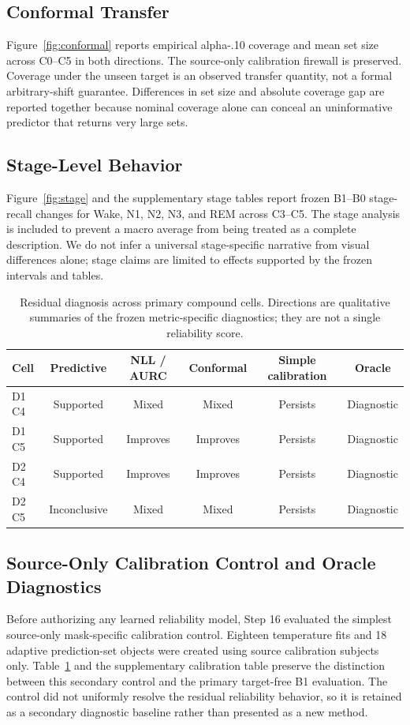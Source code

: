 \documentclass[11pt]{article}
\begin{document}
\subsection{Conformal Transfer}
Figure~\ref{fig:conformal} reports empirical alpha-.10 coverage and mean set size across C0--C5 in both directions. The source-only calibration firewall is preserved. Coverage under the unseen target is an observed transfer quantity, not a formal arbitrary-shift guarantee. Differences in set size and absolute coverage gap are reported together because nominal coverage alone can conceal an uninformative predictor that returns very large sets.

\subsection{Stage-Level Behavior}
Figure~\ref{fig:stage} and the supplementary stage tables report frozen B1--B0 stage-recall changes for Wake, N1, N2, N3, and REM across C3--C5. The stage analysis is included to prevent a macro average from being treated as a complete description. We do not infer a universal stage-specific narrative from visual differences alone; stage claims are limited to effects supported by the frozen intervals and tables.

\begin{table}[t]
\centering\scriptsize
\caption{Residual diagnosis across primary compound cells. Directions are qualitative summaries of the frozen metric-specific diagnostics; they are not a single reliability score.}
\label{tab:residual}
\begin{tabular}{lccccc}
\toprule
Cell & Predictive & NLL / AURC & Conformal & Simple calibration & Oracle\\
\midrule
D1 C4 & Supported & Mixed & Mixed & Persists & Diagnostic\\
D1 C5 & Supported & Improves & Improves & Persists & Diagnostic\\
D2 C4 & Supported & Improves & Improves & Persists & Diagnostic\\
D2 C5 & Inconclusive & Mixed & Mixed & Persists & Diagnostic\\
\bottomrule
\end{tabular}
\end{table}

\subsection{Source-Only Calibration Control and Oracle Diagnostics}
Before authorizing any learned reliability model, Step 16 evaluated the simplest source-only mask-specific calibration control. Eighteen temperature fits and 18 adaptive prediction-set objects were created using source calibration subjects only. Table~\ref{tab:residual} and the supplementary calibration table preserve the distinction between this secondary control and the primary target-free B1 evaluation. The control did not uniformly resolve the residual reliability behavior, so it is retained as a secondary diagnostic baseline rather than presented as a new method.
\end{document}
